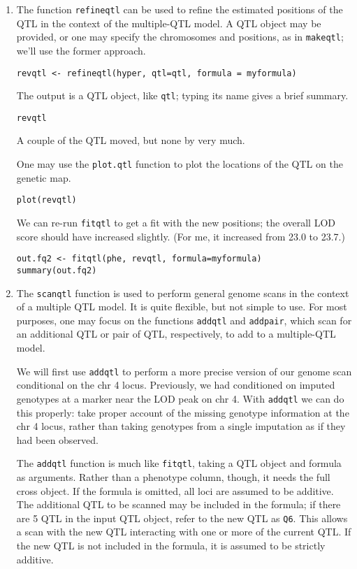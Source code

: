 \documentclass[10pt,letterpaper]{article}
\newcommand{\usercolor}{\color [named]{BlueViolet}}
\begin{document}
\begin{enumerate}
\item The function \verb-refineqtl- can be used to refine the
  estimated positions of the QTL in the context of the multiple-QTL
  model.  A QTL object may be provided, or one may specify the
  chromosomes and positions, as in \verb-makeqtl-; we'll use the
  former approach.

\usercolor
\verb|revqtl <- refineqtl(hyper, qtl=qtl, formula = myformula)|
\normalcolor

The output is a QTL object, like \verb-qtl-; typing its name gives a
brief summary.  

\usercolor \verb|revqtl| \normalcolor

A couple of the QTL moved, but none by very much.

One may use the \verb-plot.qtl- function to plot the
locations of the QTL on the genetic map.

\usercolor \verb|plot(revqtl)| \normalcolor

We can re-run \verb-fitqtl- to get a fit with the new positions; the
overall LOD score should have increased slightly.  (For me, it
increased from 23.0 to 23.7.)

\usercolor
\verb|out.fq2 <- fitqtl(phe, revqtl, formula=myformula)| \\
\verb|summary(out.fq2)|
\normalcolor

\item The \verb-scanqtl- function is used to perform general genome
  scans in the context of a multiple QTL model.  It is quite flexible,
  but not simple to use.  For most purposes, one may focus on the
  functions \verb-addqtl- and \verb-addpair-, which scan for an
  additional QTL or pair of QTL, respectively, to add to a
  multiple-QTL model.

  We will first use \verb-addqtl- to perform a more precise version of
  our genome scan conditional on the chr 4 locus.  Previously, we had
  conditioned on imputed genotypes at a marker near the LOD peak on
  chr 4.  With \verb-addqtl- we can do this properly: take proper
  account of the missing genotype information at the chr 4 locus,
  rather than taking genotypes from a single imputation as if they had
  been observed.

  The \verb-addqtl- function is much like \verb-fitqtl-, taking a QTL
  object and formula as arguments.  Rather than a phenotype column,
  though, it needs the full cross object.  If the formula is omitted,
  all loci are assumed to be additive.  The additional QTL to be
  scanned may be included in the formula; if there are 5 QTL in the
  input QTL object, refer to the new QTL as \verb-Q6-.  This allows a
  scan with the new QTL interacting with one or more of the current
  QTL.  If the new QTL is not included in the formula, it is assumed
  to be strictly additive.


\end{enumerate}
\end{document}
